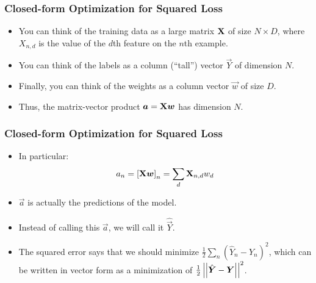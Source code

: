 \documentclass[trans]{beamer}
\begin{document}
\begin{frame}
  \frametitle{Closed-form Optimization for Squared Loss}
\begin{itemize}
\item 
You can think of the training data as a large matrix $\text{\bf X}$ of size
$N \times D$, where $X_{n,d}$ is the value of the $d$th feature on the
$n$th example. 
\item  You can think of the labels as a column (``tall'')
vector $\vec Y$ of dimension $N$.
\item  Finally, you can think of the
weights as a column vector $\vec w$ of size $D$. 
\item Thus, the
matrix-vector product $\boldsymbol{a} = \text{\bf X} \boldsymbol{w}$ has dimension $N$.
\end{itemize}
\end{frame}

\begin{frame}
  \frametitle{Closed-form Optimization for Squared Loss}
\begin{itemize}
\item 
  In
particular:
%
\begin{equation}
a_n
= \left[ \text{\bf X} \boldsymbol{w} \right]_n 
= \sum_d \text{\bf X}_{n,d} w_d
\end{equation}
%
\item  $\vec a$ is actually the predictions
of the model.
\item  Instead of calling this $\vec a$, we will call it
$\hat{\vec Y}$. 
\item The squared error says that we should minimize $\frac 1
2 \sum_n (\hat Y_n - Y_n)^2$, which can be written in vector form as a
minimization of $\frac 1 2 \left\vert\left\vert \hat{\boldsymbol{Y}} - \boldsymbol{Y} \right\vert\right\vert^2$.
\end{itemize}
\end{frame}
\end{document}
